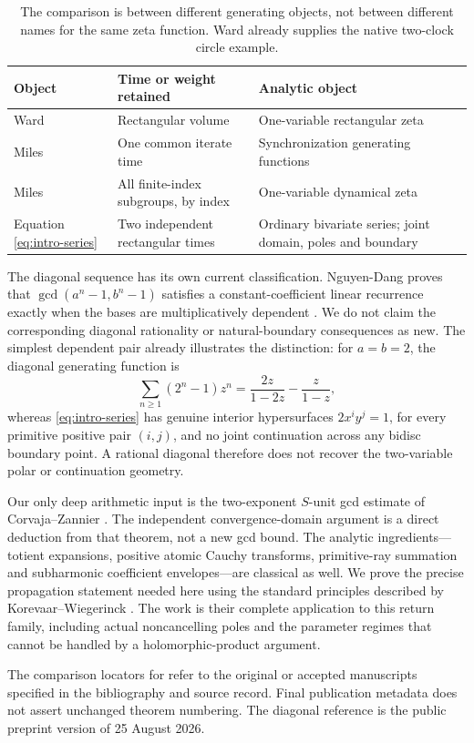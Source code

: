 \begin{table}[t]
\centering
\small
\begin{tabular}{@{}>{\raggedright\arraybackslash}p{}
>{\raggedright\arraybackslash}p{}
>{\raggedright\arraybackslash}p{}@{}}
\toprule
Object & Time or weight retained & Analytic object\\
\midrule
Ward \citep{ward1989}
& Rectangular volume
& One-variable rectangular zeta\\[3pt]
Miles \citep{miles2013}
& One common iterate time
& Synchronization generating functions\\[3pt]
Miles \citep{miles2015}
& All finite-index subgroups, by index
& One-variable dynamical zeta\\[3pt]
Equation \eqref{eq:intro-series}
& Two independent rectangular times
& Ordinary bivariate series; joint domain, poles and boundary\\
\bottomrule
\end{tabular}
\caption{The comparison is between different generating objects, not
between different names for the same zeta function. Ward
\citep{ward1992} already supplies the native two-clock circle example.}
\label{tab:objects}
\end{table}

The diagonal sequence has its own current classification.
Nguyen-Dang proves that
\(\gcd(a^n-1,b^n-1)\) satisfies a constant-coefficient linear recurrence
exactly when the bases are multiplicatively dependent
\citep[Theorem 1.1]{nguyendang2026}. We do not claim the corresponding
diagonal rationality or natural-boundary consequences as new.
The simplest dependent pair already illustrates the distinction:
for \(a=b=2\), the diagonal generating function is
\[
\sum_{n\geq1}(2^n-1)z^n
=\frac{2z}{1-2z}-\frac{z}{1-z},
\]
whereas \eqref{eq:intro-series} has genuine interior hypersurfaces
\(2x^iy^j=1\), for every primitive positive pair \((i,j)\), and
no joint continuation across any bidisc boundary point.
A rational diagonal therefore does not recover the two-variable
polar or continuation geometry.

Our only deep arithmetic input is the two-exponent \(S\)-unit gcd
estimate of Corvaja--Zannier \citep{cz2005}. The independent
convergence-domain argument is a direct deduction from that theorem,
not a new gcd bound. The analytic ingredients---totient expansions,
positive atomic Cauchy transforms, primitive-ray summation and
subharmonic coefficient envelopes---are classical as well.
We prove the precise propagation statement needed here using the
standard principles described by Korevaar--Wiegerinck \citep{kw2017}.
The work is their complete application to this return family,
including actual noncancelling poles and the parameter regimes that
cannot be handled by a holomorphic-product argument.

The comparison locators for \citep{ward1992,miles2013,miles2015,cz2005}
refer to the original or accepted manuscripts specified in the
bibliography and source record. Final publication metadata does not
assert unchanged theorem numbering. The diagonal reference
\citep{nguyendang2026} is the public preprint version of 25 August 2026.
